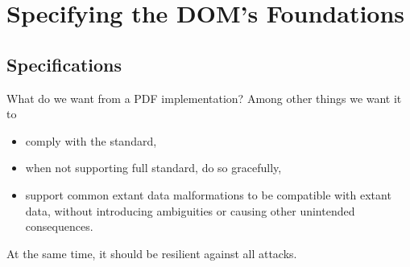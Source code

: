 
\section{Specifying the DOM's Foundations }
\label{sec:specifying}

\subsection{Specifications}

What do we want from a PDF implementation?
Among other things we want it to
\begin{itemize}
\item comply with the standard,
\item when not supporting full standard, do so gracefully,
\item support common extant data malformations
  to be compatible with extant data, without introducing ambiguities
  or causing other unintended consequences.
\end{itemize}
At the same time, it should be resilient against all attacks.

